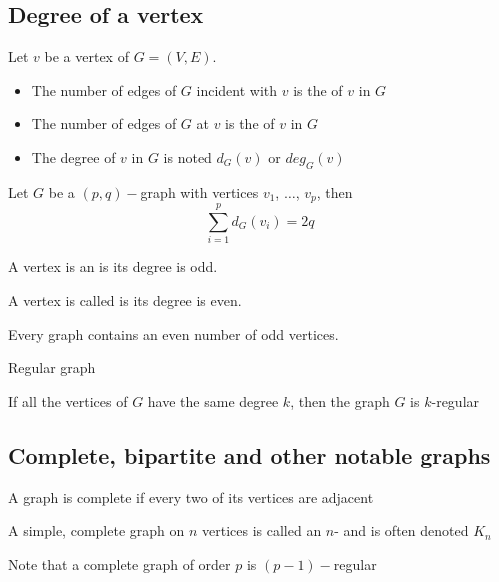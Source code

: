 \documentclass[aspectratio=43]{beamer}
\begin{document}
\subsection{Degree of a vertex}

\begin{frame}
	\begin{definition}
	Let $v$ be a vertex of $G=(V,E)$.
	\begin{itemize}
	\item The number of edges of $G$ incident with $v$ is the  of $v$ in $G$
	\item The number of edges of $G$ at $v$ is the  of $v$ in $G$
	\item The degree of $v$ in $G$ is noted $d_G(v)$ or $deg_G(v)$
	\end{itemize}
	\end{definition}
	\vfill
	\begin{theorem}
	Let $G$ be a $(p,q)-$graph with vertices $v_1$, $\dots$, $v_p$, then
	\[
		\sum_{i=1}^{p}d_G(v_i)=2q
	\]
	\end{theorem}
\end{frame}

\begin{frame}
\begin{definition}
A vertex is an  is its degree is odd.
\end{definition}
\vfill
\begin{definition}
A vertex is called  is its degree is even.
\end{definition}
\vfill
\begin{theorem}
Every graph contains an even number of odd vertices.
\end{theorem}
\end{frame}

\begin{frame}{Regular graph}
\begin{definition}
	If all the vertices of $G$ have the same degree $k$, then the graph $G$ is $k$-regular
\end{definition}
\end{frame}



\subsection{Complete, bipartite and other notable graphs}
\begin{frame}
\begin{definition}
A graph is complete if every two of its vertices are adjacent
\end{definition}
\vfill
\begin{definition}[$n$-clique]
	A simple, complete graph on $n$ vertices is called an $n$- and is often denoted $K_n$
\end{definition}
\vfill
Note that a complete graph of order $p$ is $(p-1)-$regular
\end{frame}
\end{document}
